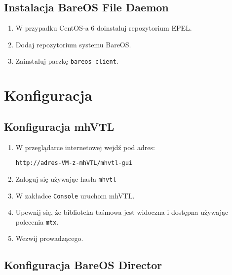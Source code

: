 \documentclass[polish]{article}
\begin{document}
\subsection*{Instalacja BareOS File Daemon}

\begin{enumerate}

\item W przypadku CentOS-a 6 doinstaluj repozytorium EPEL.

\item Dodaj repozytorium systemu BareOS.

\item Zainstaluj paczkę \texttt{bareos-client}.

\end{enumerate}


\section{Konfiguracja}


\subsection*{Konfiguracja mhVTL}

\begin{enumerate}

\item W przeglądarce internetowej wejdź pod adres:
\begin{verbatim}
http://adres-VM-z-mhVTL/mhvtl-gui
\end{verbatim}

\item Zaloguj się używając hasła \texttt{mhvtl}

\item W zakładce \texttt{Console} uruchom mhVTL.

\item Upewnij się, że biblioteka taśmowa jest widoczna i dostępna używając polecenia \texttt{mtx}.

\item Wezwij prowadzącego.

\end{enumerate}


\subsection*{Konfiguracja BareOS Director}
\end{document}
